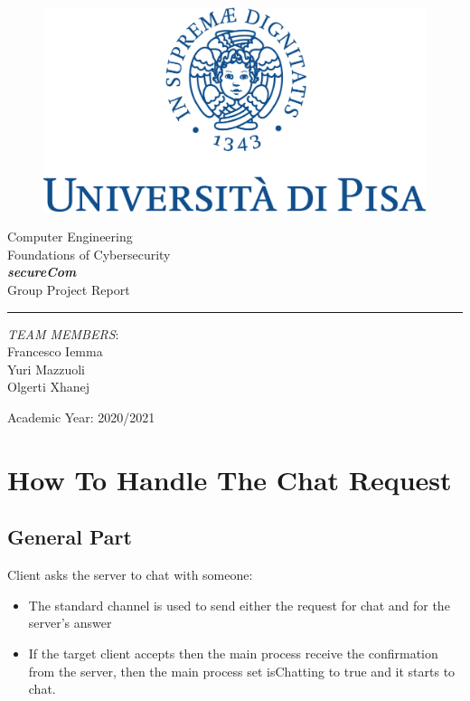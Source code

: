 \documentclass[11pt]{report}
\begin{document}
\begin{titlepage}
	\begin{center}
		\begin{figure}
			\includegraphics[width=\textwidth]{img/marchio_unipi_pant541-eps-converted-to.pdf}         
		\end{figure}
		{\Large
			Computer Engineering\\
			\vspace{5mm} %
			Foundations of Cybersecurity}\\
		\vspace{30mm} %
		{\Huge\textbf{\textit{secureCom}}}\\
		\vspace{10mm} %
		{\Large Group Project Report}\\
		\par\noindent\rule{\textwidth}{0.4pt}
		\begin{flushright}
			\textit{TEAM MEMBERS}:\\ 
			Francesco Iemma\\
			Yuri Mazzuoli\\ 
			Olgerti Xhanej\\
			
		\end{flushright}
		\vfill
		Academic Year: 2020/2021\\        
	\end{center}
\end{titlepage} 
\tableofcontents

\chapter{How To Handle The Chat Request}

\section{General Part}
\noindent Client asks the server to chat with someone: 
\begin{itemize}
	\item The standard channel is used to send either the request for chat and for the server's answer
	\item If the target client accepts then the main process receive the confirmation from the server, then the main process set isChatting to true and it
	starts to chat.
\end{itemize}
\end{document}
